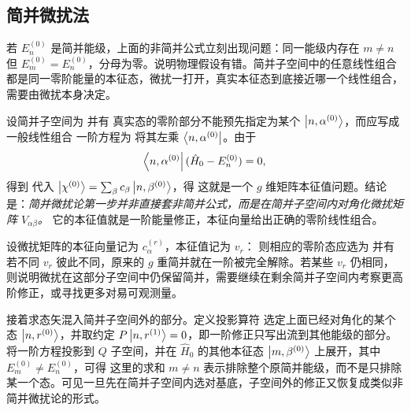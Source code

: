 \subsection{简并微扰法}

若 $E_n^{(0)}$ 是简并能级，上面的非简并公式立刻出现问题：同一能级内存在 $m\neq n$ 但 $E_m^{(0)}=E_n^{(0)}$，分母为零。说明物理假设有错。简并子空间中的任意线性组合都是同一零阶能量的本征态，微扰一打开，真实本征态到底接近哪一个线性组合，需要由微扰本身决定。

设简并子空间为
并有
真实态的零阶部分不能预先指定为某个 $\ket{n,\alpha^{(0)}}$，而应写成一般线性组合
一阶方程为
将其左乘 $\bra{n,\alpha^{(0)}}$。由于
\[
    \bra{n,\alpha^{(0)}}(\hat H_0-E_n^{(0)})=0,
\]
得到
代入 $\ket{\chi^{(0)}}=\sum_\beta c_\beta\ket{n,\beta^{(0)}}$，得
这就是一个 $g$ 维矩阵本征值问题。结论是：\textit{简并微扰论第一步并非直接套非简并公式，而是在简并子空间内对角化微扰矩阵 $V_{\alpha\beta}$。} 它的本征值就是一阶能量修正，本征向量给出正确的零阶线性组合。

设微扰矩阵的本征向量记为 $c_\alpha^{(r)}$，本征值记为 $v_r$：
则相应的零阶态应选为
并有
若不同 $v_r$ 彼此不同，原来的 $g$ 重简并就在一阶被完全解除。若某些 $v_r$ 仍相同，则说明微扰在这部分子空间中仍保留简并，需要继续在剩余简并子空间内考察更高阶修正，或寻找更多对易可观测量。

接着求态矢混入简并子空间外的部分。定义投影算符
选定上面已经对角化的某个态 $\ket{n,r^{(0)}}$，并取约定 $P\ket{n,r^{(1)}}=0$，即一阶修正只写出流到其他能级的部分。将一阶方程投影到 $Q$ 子空间，并在 $\hat H_0$ 的其他本征态 $\ket{m,\beta^{(0)}}$ 上展开，其中 $E_m^{(0)}\neq E_n^{(0)}$，可得
这里的求和 $m\neq n$ 表示排除整个原简并能级，而不是只排除某一个态。可见一旦先在简并子空间内选对基底，子空间外的修正又恢复成类似非简并微扰论的形式。

